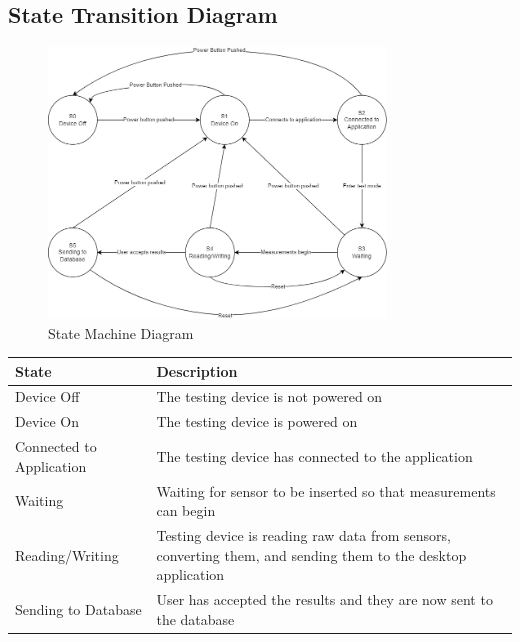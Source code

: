\documentclass[12pt]{article}
\begin{document}
\subsection{State Transition Diagram}
\begin{figure}[h!]
\begin{center}
\includegraphics[width=0.8\textwidth]{state_machine_diagram}
\caption{State Machine Diagram}
\label{Fig_StateMachineDiagram} 
\end{center}
\end{figure}

\begin{tabular}{| p{} | p{}|}
  \hline
  \rowcolor[gray]{0.9}
  State & Description \\
  \hline
  Device Off & The testing device is not powered on\\
  \hline
  Device On &  The testing device is powered on\\
  \hline
  Connected to Application & The testing device has connected to the application \\
  \hline
  Waiting & Waiting for sensor to be inserted so that measurements can begin \\
  \hline
  Reading/Writing & Testing device is reading raw data from sensors, converting them, and sending them to the desktop application \\
  \hline
  Sending to Database & User has accepted the results and they are now sent to the database \\
  \hline
\end{tabular}
\end{document}
